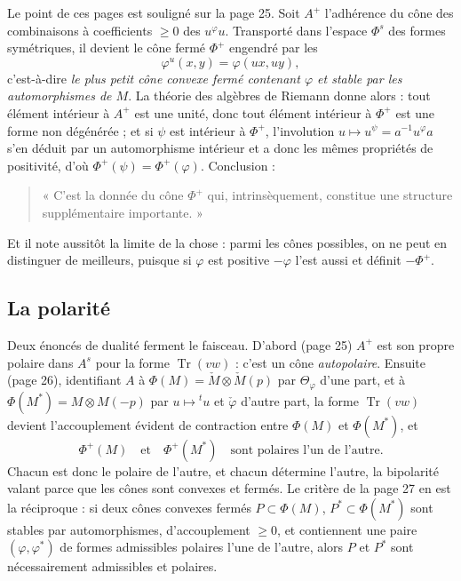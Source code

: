 \documentclass[11pt,a4paper]{article}
\begin{document}
Le point de ces pages est souligné sur la page 25. Soit $A^{+}$
l'adhérence du cône des combinaisons à coefficients $\geqslant 0$ des
$u^{\varphi}u$. Transporté dans l'espace $\Phi^{s}$ des formes symétriques, il
devient le cône fermé $\Phi^{+}$ engendré par les
\[
\varphi^{u}(x,y) = \varphi(ux, uy) ,
\]
c'est-à-dire \emph{le plus petit cône convexe fermé contenant $\varphi$ et
stable par les automorphismes de $M$}. La théorie des algèbres de Riemann donne
alors : tout élément intérieur à $A^{+}$ est une unité, donc tout élément
intérieur à $\Phi^{+}$ est une forme non dégénérée ; et si $\psi$ est intérieur
à $\Phi^{+}$, l'involution $u \mapsto u^{\psi} = a^{-1}u^{\varphi}a$ s'en
déduit par un automorphisme intérieur et a donc les mêmes propriétés de
positivité, d'où $\Phi^{+}(\psi) = \Phi^{+}(\varphi)$. Conclusion :
\begin{quote}
« C'est la donnée du cône $\Phi^{+}$ qui, intrinsèquement, constitue une
structure supplémentaire importante. »
\end{quote}
Et il note aussitôt la limite de la chose : parmi les cônes possibles, on ne
peut en distinguer de meilleurs, puisque si $\varphi$ est positive $-\varphi$
l'est aussi et définit $-\Phi^{+}$.

\subsection*{La polarité}

Deux énoncés de dualité ferment le faisceau. D'abord (page 25) $A^{+}$ est son
propre polaire dans $A^{s}$ pour la forme $\operatorname{Tr}(vw)$ : c'est un
cône \emph{autopolaire}. Ensuite (page 26), identifiant $A$ à $\Phi(M) =
\check{M} \otimes \check{M}(p)$ par $\Theta_{\varphi}$ d'une part, et à
$\Phi(M^{*}) = M \otimes M(-p)$ par $u \mapsto {}^{t}u$ et $\check{\varphi}$
d'autre part, la forme $\operatorname{Tr}(vw)$ devient l'accouplement évident
de contraction entre $\Phi(M)$ et $\Phi(M^{*})$, et
\[
\Phi^{+}(M) \quad\text{et}\quad \Phi^{+}(M^{*}) \quad\text{sont polaires l'un
de l'autre.}
\]
Chacun est donc le polaire de l'autre, et chacun détermine l'autre, la
bipolarité valant parce que les cônes sont convexes et fermés. Le critère de la
page 27 en est la réciproque : si deux cônes convexes fermés $P \subset
\Phi(M)$, $P^{*} \subset \Phi(M^{*})$ sont stables par automorphismes,
d'accouplement $\geqslant 0$, et contiennent une paire $(\varphi,
\varphi^{*})$ de formes admissibles polaires l'une de l'autre, alors $P$ et
$P^{*}$ sont nécessairement admissibles et polaires.
\end{document}
